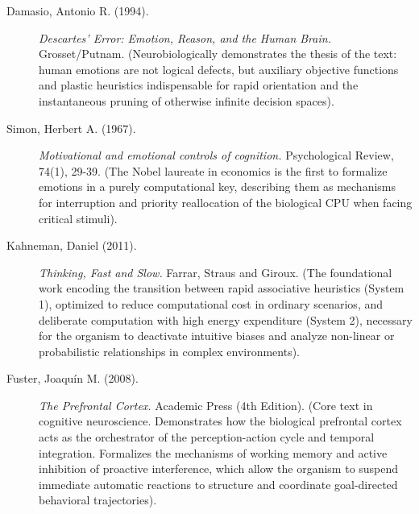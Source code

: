 \documentclass[11pt,a4paper,oneside]{article} %
\begin{document}
\begin{description}
\item[Damasio, Antonio R. (1994).] \emph{Descartes' Error: Emotion, Reason, and the Human Brain.} Grosset/Putnam. (Neurobiologically demonstrates the thesis of the text: human emotions are not logical defects, but auxiliary objective functions and plastic heuristics indispensable for rapid orientation and the instantaneous pruning of otherwise infinite decision spaces).

\item[Simon, Herbert A. (1967).] \emph{Motivational and emotional controls of cognition.} Psychological Review, 74(1), 29-39. (The Nobel laureate in economics is the first to formalize emotions in a purely computational key, describing them as mechanisms for interruption and priority reallocation of the biological CPU when facing critical stimuli).
\end{description}

\hypertarget{a1.4-tactical-will-and-inferential-latent-computation}{%
\label{a1.4-tactical-will-and-inferential-latent-computation}}

\begin{description}
\item[Kahneman, Daniel (2011).] \emph{Thinking, Fast and Slow.} Farrar, Straus and Giroux. (The foundational work encoding the transition between rapid associative heuristics (System 1), optimized to reduce computational cost in ordinary scenarios, and deliberate computation with high energy expenditure (System 2), necessary for the organism to deactivate intuitive biases and analyze non-linear or probabilistic relationships in complex environments).

\item[Fuster, Joaquín M. (2008).] \emph{The Prefrontal Cortex.} Academic Press (4th Edition). (Core text in cognitive neuroscience. Demonstrates how the biological prefrontal cortex acts as the orchestrator of the perception-action cycle and temporal integration. Formalizes the mechanisms of working memory and active inhibition of proactive interference, which allow the organism to suspend immediate automatic reactions to structure and coordinate goal-directed behavioral trajectories).
\end{description}

\hypertarget{a1.5-strategic-mastery-and-cls-memory-models}{%
\label{a1.5-strategic-mastery-and-cls-memory-models}}
\end{document}
